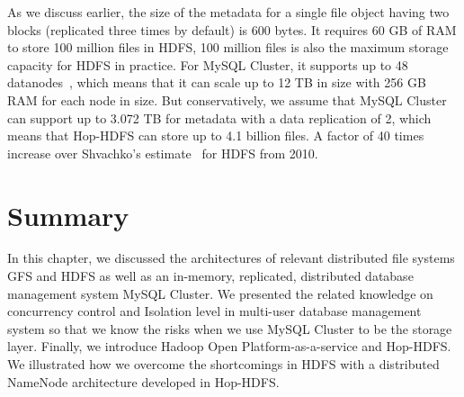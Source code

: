 \noindent As we discuss earlier, the size of the metadata for a single file object having two blocks (replicated three times by default) is 600 bytes. It requires 60 GB of RAM to store 100 million files in HDFS, 100 million files is also the maximum storage capacity for HDFS in practice. For MySQL Cluster, it supports up to 48 datanodes~\cite{mysql48nodes}, which means that it can scale up to 12 TB in size with 256 GB RAM for each node in size. But conservatively, we assume that MySQL Cluster can support up to 3.072 TB for metadata with a data replication of 2, which means that Hop-HDFS can store up to 4.1 billion files. A factor of 40 times increase over Shvachko's estimate~\cite{shvachko2010hdfs} for HDFS from 2010.

\section*{Summary}
In this chapter, we discussed the architectures of relevant distributed file systems GFS and HDFS as well as an in-memory, replicated, distributed database management system MySQL Cluster. We presented the related knowledge on concurrency control and Isolation level in multi-user database management system so that we know the risks when we use MySQL Cluster to be the storage layer. Finally, we introduce Hadoop Open Platform-as-a-service and Hop-HDFS. We illustrated how we overcome the shortcomings in HDFS with a distributed NameNode architecture developed in Hop-HDFS.